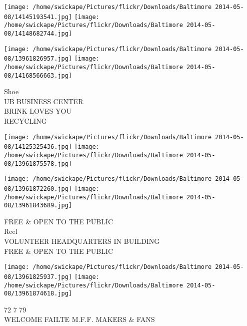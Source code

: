 \documentclass[10pt,letterpaper]{article}
\begin{document}
\texttt{[image: /home/swickape/Pictures/flickr/Downloads/Baltimore 2014-05-08/14145193541.jpg]}
\texttt{[image: /home/swickape/Pictures/flickr/Downloads/Baltimore 2014-05-08/14148682744.jpg]}

\texttt{[image: /home/swickape/Pictures/flickr/Downloads/Baltimore 2014-05-08/13961826957.jpg]}
\texttt{[image: /home/swickape/Pictures/flickr/Downloads/Baltimore 2014-05-08/14168566663.jpg]}

Shoe\\
UB BUSINESS CENTER\\
BRINK LOVES YOU\\
RECYCLING\\
\pagebreak

\texttt{[image: /home/swickape/Pictures/flickr/Downloads/Baltimore 2014-05-08/14125325436.jpg]}
\texttt{[image: /home/swickape/Pictures/flickr/Downloads/Baltimore 2014-05-08/13961875578.jpg]}

\texttt{[image: /home/swickape/Pictures/flickr/Downloads/Baltimore 2014-05-08/13961872260.jpg]}
\texttt{[image: /home/swickape/Pictures/flickr/Downloads/Baltimore 2014-05-08/13961843689.jpg]}

FREE \& OPEN TO THE PUBLIC\\
Reel\\
VOLUNTEER HEADQUARTERS IN BUILDING\\
FREE \& OPEN TO THE PUBLIC\\
\pagebreak

\texttt{[image: /home/swickape/Pictures/flickr/Downloads/Baltimore 2014-05-08/13961825937.jpg]}
\texttt{[image: /home/swickape/Pictures/flickr/Downloads/Baltimore 2014-05-08/13961874618.jpg]}

72 7 79\\
WELCOME FAILTE M.F.F. MAKERS \& FANS\\
\pagebreak
\end{document}
